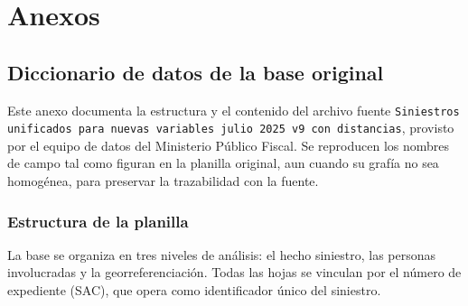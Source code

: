 \chapter{Anexos}\label{anexos}

\section{Diccionario de datos de la base original}
\label{sec:diccionario-datos}

Este anexo documenta la estructura y el contenido del archivo fuente
\texttt{Siniestros unificados para nuevas variables julio 2025 v9 con distancias},
provisto por el equipo de datos del Ministerio Público Fiscal. Se reproducen los
nombres de campo tal como figuran en la planilla original, aun cuando su grafía no
sea homogénea, para preservar la trazabilidad con la fuente.

\subsection{Estructura de la planilla}
\label{ssec:estructura-planilla}

La base se organiza en tres niveles de análisis: el hecho siniestro, las personas
involucradas y la georreferenciación. Todas las hojas se vinculan por el número de
expediente (SAC), que opera como identificador único del siniestro.


